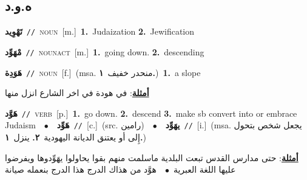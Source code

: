 \documentclass[10pt,a4paper,twoside]{article} %
\begin{document}
\begin{multicols}{2}
\vspace{-3mm}
\subsection*{\color{blue}\foreignlanguage{arabic}{ه.و.د}\color{blue}{}} 

{\setlength\topsep{0pt}\textbf{\foreignlanguage{arabic}{تَهْوِيد}}\ {\color{gray}\texttt{//}\color{black}}\ \textsc{noun}\ [m.]\ \textbf{1.}~Judaization  \textbf{2.}~Jewification\ } \vspace{2mm}

{\setlength\topsep{0pt}\textbf{\foreignlanguage{arabic}{مْهَوِّد}}\ {\color{gray}\texttt{//}\color{black}}\ \textsc{noun\textunderscore act}\ [m.]\ \textbf{1.}~going down.  \textbf{2.}~descending\ } \vspace{2mm}

{\setlength\topsep{0pt}\textbf{\foreignlanguage{arabic}{هَوَدِة}}\ {\color{gray}\texttt{//}\color{black}}\ \textsc{noun}\ [f.]\ \color{gray}(msa. \foreignlanguage{arabic}{منحدر خفيف}~\foreignlanguage{arabic}{\textbf{١.}})\color{black}\ \textbf{1.}~a slope\  \begin{flushright}\color{gray}\foreignlanguage{arabic}{\textbf{\underline{\foreignlanguage{arabic}{أمثلة}}}: في هودة في اخر الشارع انزل منها}\end{flushright}\color{black}} \vspace{2mm}

{\setlength\topsep{0pt}\textbf{\foreignlanguage{arabic}{هَوَّد}}\ {\color{gray}\texttt{//}\color{black}}\ \textsc{verb}\ [p.]\ \textbf{1.}~go down.  \textbf{2.}~descend  \textbf{3.}~make sb convert into or embrace Judaism\ \ $\bullet$\ \ \setlength\topsep{0pt}\textbf{\foreignlanguage{arabic}{هَوِّد}}\ {\color{gray}\texttt{//}\color{black}}\ [c.]\ (src. \color{gray}\foreignlanguage{arabic}{رامين}\color{black})\ \ $\bullet$\ \ \setlength\topsep{0pt}\textbf{\foreignlanguage{arabic}{يهَوِّد}}\ {\color{gray}\texttt{//}\color{black}}\ [i.]\ \color{gray}(msa. \foreignlanguage{arabic}{يجعل شخص بتحول إِلى أو يعتنق الديانة اليهودية}~\foreignlanguage{arabic}{\textbf{٢.}}  \foreignlanguage{arabic}{ينزل}~\foreignlanguage{arabic}{\textbf{١.}})\color{black}\  \begin{flushright}\color{gray}\foreignlanguage{arabic}{\textbf{\underline{\foreignlanguage{arabic}{أمثلة}}}: حتى مدارس القدس تبعت البلدية ماسلمت منهم بقوا يحاولوا يهَوِّدوها ويفرضوا عليها اللغة العبرية\ $\bullet$\ \  هوَّد من هذاك الدرج هذا الدرج بنعمله صيانة}\end{flushright}\color{black}} \vspace{2mm}


\end{multicols}
\end{document}
